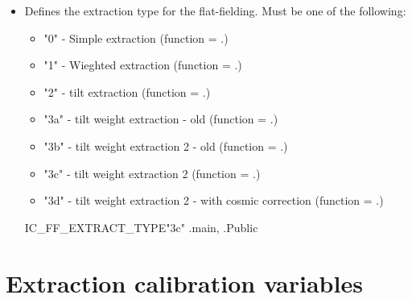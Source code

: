 \begin{itemize}
\item {} 
{Defines the extraction type for the flat-fielding. Must be one of the following:
\begin{itemize}
	\item "0" - Simple extraction (function = \spirouEXTOR.)
	\item "1" - Wieghted extraction (function = \spirouEXTOR.)
	\item "2" - tilt extraction (function = \spirouEXTOR.)
	\item "3a" - tilt weight extraction - old (function = \spirouEXTOR.)
	\item "3b" - tilt weight extraction 2 - old (function = \spirouEXTOR.)
	\item "3c" - tilt weight extraction 2 (function = \spirouEXTOR.)
	\item "3d" - tilt weight extraction 2 - with cosmic correction (function = \spirouEXTOR.)
\end{itemize}
}
{IC\_FF\_EXTRACT\_TYPE}{"3c"}
{\calFFraw}{\constantsfile}{\calFFraw.main, \spirouEXTOR.}{Public}

\end{itemize}


\clearpage
\newpage
\section{Extraction calibration variables}
\label{ch:variables:extraction}

